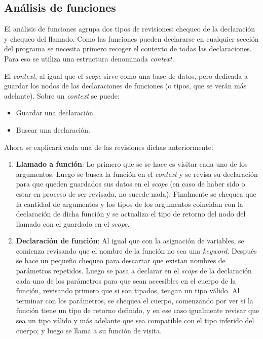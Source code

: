 \documentclass{llncs}
\begin{document}
\subsection{Análisis de funciones}

El análisis de funciones agrupa dos tipos de revisiones: chequeo de la declaración y chequeo del llamado. Como las funciones pueden declararse en cualquier sección del programa 
se necesita primero recoger el contexto de todas las declaraciones. Para eso se utiliza una estructura denominada \textit{context}.

El \textit{context}, al igual que el \textit{scope} sirve como una base de datos, pero dedicada a guardar los nodos de las declaraciones de funciones (o tipos, que se verán más adelante). 
Sobre un \textit{context} se puede: 
\begin{itemize}
    \item Guardar una declaración.
    \item Buscar una declaración.
\end{itemize}

Ahora se explicará cada una de las revisiones dichas anteriormente:
\begin{enumerate}
    \item \textbf{Llamado a función}: Lo primero que se se hace es visitar cada uno de los argumentos. Luego se busca la función en el \textit{context} y se revisa su declaración para que queden guardados sus 
    datos en el \textit{scope} (en caso de haber sido o estar en proceso de ser revisada, no sucede nada). Finalmente se chequea que la cantidad de argumentos y los tipos de los argumentos coincidan con la declaración 
    de dicha función y se actualiza el tipo de retorno del nodo del llamado con el guardado en el \textit{scope}.
    \item \textbf{Declaración de función}: Al igual que con la asignación de variables, se comienza revisando que el nombre de la función no sea una \textit{keyword}. Después se hace un pequeño chequeo para descartar que existan 
    nombres de parámetros repetidos. Luego se pasa a declarar en el \textit{scope} de la declaración cada uno de los parámetros para que sean accesibles en el cuerpo de la función, revisando primero que si son tipados, tengan un tipo válido. Al terminar 
    con los parámetros, se chequea el cuerpo, comenzando por ver si la función tiene un tipo de retorno definido, y en ese caso igualmente revisar que sea un tipo válido y más adelante que sea compatible con el tipo inferido del cuerpo; y luego se llama a su
    función de visita.
\end{enumerate}
\end{document}
